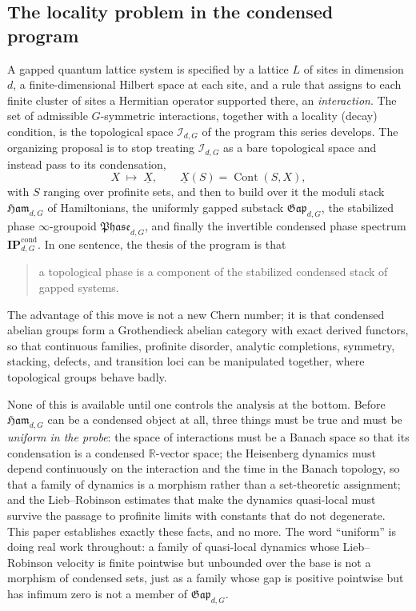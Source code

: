 \documentclass[12pt]{article}
\newcommand{\cond}[1]{\underline{#1}}          %
\newcommand{\Cont}{\operatorname{Cont}}        %
\newcommand{\Int}{\mathcal{I}}                 %
\newcommand{\Ham}{\mathfrak{Ham}}              %
\newcommand{\Gap}{\mathfrak{Gap}}              %
\newcommand{\Phase}{\mathfrak{Phase}}          %
\newcommand{\IPcond}{\mathbf{IP}^{\mathrm{cond}}}  %
\newcommand{\R}{\mathbb{R}}
\theoremstyle{definition}
\theoremstyle{remark}
\begin{document}
\subsection{The locality problem in the condensed program}
\label{sec:intro-problem}

A gapped quantum lattice system is specified by a lattice $L$ of sites in dimension $d$, a
finite-dimensional Hilbert space at each site, and a rule that assigns to each finite cluster
of sites a Hermitian operator supported there, an \emph{interaction}. The set of admissible
$G$-symmetric interactions, together with a locality (decay) condition, is the topological
space $\Int_{d,G}$ of the program this series develops. The organizing proposal is to stop
treating $\Int_{d,G}$ as a bare topological space and instead pass to its condensation,
\[
  X \;\longmapsto\; \cond{X}, \qquad \cond{X}(S)=\Cont(S,X),
\]
with $S$ ranging over profinite sets, and then to build over it the moduli stack
$\Ham_{d,G}$ of Hamiltonians, the uniformly gapped substack $\Gap_{d,G}$, the stabilized
phase $\infty$-groupoid $\Phase_{d,G}$, and finally the invertible condensed phase spectrum
$\IPcond_{d,G}$. In one sentence, the thesis of the program is that
\begin{quote}
  a topological phase is a component of the stabilized condensed stack of gapped systems.
\end{quote}
The advantage of this move is not a new Chern number; it is that condensed abelian groups
form a Grothendieck abelian category with exact derived functors, so that continuous
families, profinite disorder, analytic completions, symmetry, stacking, defects, and
transition loci can be manipulated together, where topological groups behave badly.

None of this is available until one controls the analysis at the bottom. Before $\Ham_{d,G}$
can be a condensed object at all, three things must be true and must be \emph{uniform in the
probe}: the space of interactions must be a Banach space so that its condensation is a
condensed $\R$-vector space; the Heisenberg dynamics must depend continuously on the
interaction and the time in the Banach topology, so that a family of dynamics is a morphism
rather than a set-theoretic assignment; and the Lieb--Robinson estimates that make the
dynamics quasi-local must survive the passage to profinite limits with constants that do not
degenerate. This paper establishes exactly these facts, and no more. The word ``uniform'' is
doing real work throughout: a family of quasi-local dynamics whose Lieb--Robinson velocity is
finite pointwise but unbounded over the base is not a morphism of condensed sets, just as a
family whose gap is positive pointwise but has infimum zero is not a member of $\Gap_{d,G}$.
\end{document}
